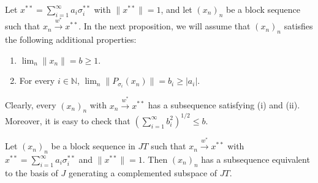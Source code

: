 \documentclass[10pt,a4paper]{amsart}
\newcommand{\N}{\mathbb{N}}
\newcommand{\s}{\sigma}
\begin{document}
\begin{remark}\label{R1}
Let $x^{**} = \sum_{i=1}^\infty a_i\s_i^{**}$ with  $\|x^{**}\| = 1$, and let $(x_n)_n$ be a block sequence such that $x_n \xrightarrow{w^*} x^{**}$. In the next proposition, we will assume that $(x_n)_n$ satisfies the following additional properties:
\begin{enumerate}
    \item[i)] $\lim_n \|x_n\| = b \geq 1$.
    \item[ii)] For every $i \in \N$, $\lim_n \|P_{\s_i}(x_n)\| = b_i \geq |a_i|$.
\end{enumerate}
Clearly, every $(x_n)_n$ with $x_n \xrightarrow{w^*} x^{**}$ has a subsequence satisfying (i) and (ii). Moreover, it is easy to check that $(\sum_{i=1}^\infty b_i^2)^{1/2} \leq b$.
\end{remark}

\begin{proposition}\label{P11}
Let $(x_n)_n$ be a block sequence in $JT$ such that
$x_n \xrightarrow{w^*} x^{**}$ with $x^{**} = \sum_{i=1}^\infty a_i \s_i^{**}$ and $\|x^{**}\| = 1$.
Then $(x_n)_n$ has a subsequence equivalent to the basis of $J$ generating a complemented subspace of $JT$.
\end{proposition}
\end{document}

